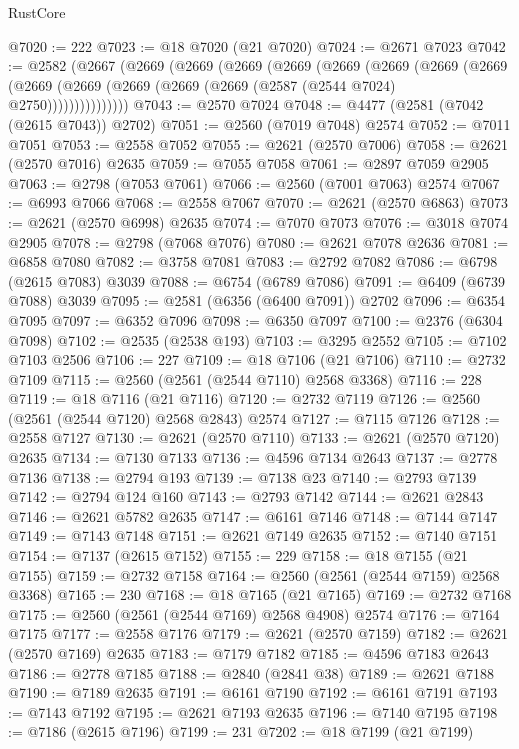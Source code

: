 \begin{lexlean}{RustCore}
\begin{coremodule}
@7020 := 222
@7023 := @18 @7020 (@21 @7020)
@7024 := @2671 @7023
@7042 := @2582
    (@2667
      (@2669
        (@2669
          (@2669
            (@2669
              (@2669
                (@2669
                  (@2669
                    (@2669
                      (@2669 (@2669 (@2669 (@2669 (@2669 (@2587 (@2544 @7024) @2750)))))))))))))))
@7043 := @2570 @7024
@7048 := @4477 (@2581 (@7042 (@2615 @7043)) @2702)
@7051 := @2560 (@7019 @7048) @2574
@7052 := @7011 @7051
@7053 := @2558 @7052
@7055 := @2621 (@2570 @7006)
@7058 := @2621 (@2570 @7016) @2635
@7059 := @7055 @7058
@7061 := @2897 @7059 @2905
@7063 := @2798 (@7053 @7061)
@7066 := @2560 (@7001 @7063) @2574
@7067 := @6993 @7066
@7068 := @2558 @7067
@7070 := @2621 (@2570 @6863)
@7073 := @2621 (@2570 @6998) @2635
@7074 := @7070 @7073
@7076 := @3018 @7074 @2905
@7078 := @2798 (@7068 @7076)
@7080 := @2621 @7078 @2636
@7081 := @6858 @7080
@7082 := @3758 @7081
@7083 := @2792 @7082
@7086 := @6798 (@2615 @7083) @3039
@7088 := @6754 (@6789 @7086)
@7091 := @6409 (@6739 @7088) @3039
@7095 := @2581 (@6356 (@6400 @7091)) @2702
@7096 := @6354 @7095
@7097 := @6352 @7096
@7098 := @6350 @7097
@7100 := @2376 (@6304 @7098)
@7102 := @2535 (@2538 @193)
@7103 := @3295 @2552
@7105 := @7102 @7103 @2506
@7106 := 227
@7109 := @18 @7106 (@21 @7106)
@7110 := @2732 @7109
@7115 := @2560 (@2561 (@2544 @7110) @2568 @3368)
@7116 := 228
@7119 := @18 @7116 (@21 @7116)
@7120 := @2732 @7119
@7126 := @2560 (@2561 (@2544 @7120) @2568 @2843) @2574
@7127 := @7115 @7126
@7128 := @2558 @7127
@7130 := @2621 (@2570 @7110)
@7133 := @2621 (@2570 @7120) @2635
@7134 := @7130 @7133
@7136 := @4596 @7134 @2643
@7137 := @2778 @7136
@7138 := @2794 @193
@7139 := @7138 @23
@7140 := @2793 @7139
@7142 := @2794 @124 @160
@7143 := @2793 @7142
@7144 := @2621 @2843
@7146 := @2621 @5782 @2635
@7147 := @6161 @7146
@7148 := @7144 @7147
@7149 := @7143 @7148
@7151 := @2621 @7149 @2635
@7152 := @7140 @7151
@7154 := @7137 (@2615 @7152)
@7155 := 229
@7158 := @18 @7155 (@21 @7155)
@7159 := @2732 @7158
@7164 := @2560 (@2561 (@2544 @7159) @2568 @3368)
@7165 := 230
@7168 := @18 @7165 (@21 @7165)
@7169 := @2732 @7168
@7175 := @2560 (@2561 (@2544 @7169) @2568 @4908) @2574
@7176 := @7164 @7175
@7177 := @2558 @7176
@7179 := @2621 (@2570 @7159)
@7182 := @2621 (@2570 @7169) @2635
@7183 := @7179 @7182
@7185 := @4596 @7183 @2643
@7186 := @2778 @7185
@7188 := @2840 (@2841 @38)
@7189 := @2621 @7188
@7190 := @7189 @2635
@7191 := @6161 @7190
@7192 := @6161 @7191
@7193 := @7143 @7192
@7195 := @2621 @7193 @2635
@7196 := @7140 @7195
@7198 := @7186 (@2615 @7196)
@7199 := 231
@7202 := @18 @7199 (@21 @7199)

\end{coremodule}
\end{lexlean}
